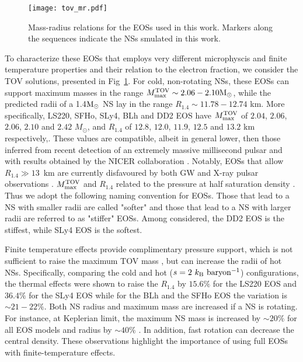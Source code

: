 \begin{figure}[t]
    \centering 
    \texttt{[image: tov\_mr.pdf]}
    \caption{Mass-radius relations for the EOSs used in this work. 
        Markers along the sequences indicate the NSs smulated in this work.}  
    \label{fig:method:tov_mr}
\end{figure}
To characterize these \acp{EOS} that employs very different microphyscis and finite 
temperature properties and their relation to the electron fraction, we consider the \ac{TOV} solutions, 
presented in Fig~\ref{fig:method:tov_mr}.
%
For cold, non-rotating \acp{NS}, these \acp{EOS} can support maximum 
masses in the range $M_\text{max}^\text{TOV}\sim 2.06-2.10{\text{M}_{\odot}}$, while the predicted radii of a 1.4${\text{M}_{\odot}}$ 
NS lay in the range $R_{1.4}\sim 11.78-12.74$ km. 
More specifically, LS220, SFHo, SLy4, BLh and DD2 \ac{EOS} have 
$M_\text{max}^\text{TOV}$ of $2.04$, $2.06$, $2.06$, $2.10$ and $2.42$ $M_\odot$, and 
$R_{1.4}$ of $12.8$, $12.0$, $11.9$, $12.5$ and $13.2$ km respectively,.
%
These values are compatible, albeit in general lower, then those inferred from 
recent detection of an extremely massive millisecond pulsar \citep{Cromartie:2019kug} and with results obtained 
by the NICER collaboration \citep{Miller:2019cac,Riley:2019yda}.
Notably, \acp{EOS} that allow $R_{1.4}\gg 13$~km are currently disfavoured by both 
\ac{GW} \GW{} and X-ray pulsar observations \citep{Abbott:2018wiz,Miller:2019cac,Riley:2019yda}.
%
$M_\text{max}^\text{TOV}$ and $R_{1.4}$ related to the pressure at half saturation density \citep{Lattimer:2012nd}.
Thus we adopt the following naming convention for \acp{EOS}. Those that lead to a \ac{NS} with smaller 
radii are called "softer" and those that lead to a NS with larger radii are referred to as "stiffer" \acp{EOS}. 
Among considered, the DD2 \ac{EOS} is the stiffest, while SLy4 \ac{EOS} is the softest.

Finite temperature effects provide complimentary pressure support,
which is not sufficient to raise the maximum \ac{TOV} mass 
\citep{Kaplan:2013wra}, but can increase the radii of hot \acp{NS}.
Specifically, comparing the cold and hot ($s=2~{k_{\rm B}~{\rm baryon^{-1}}}$)
configurations, the thermal effects were shown to raise the $R_{1.4}$
by $15.6 \%$ for the LS220 EOS and $36.4 \%$ for the SLy4 EOS 
while for the BLh and the SFHo EOS the variation is $\sim 21-22 \%$.
%
Both \ac{NS} radius and maximum mass are increased if a \ac{NS} is rotating. 
For instance, at Keplerian limit, the maximum \ac{NS} mass is increased by 
$\sim 20\%$ for all \ac{EOS} models and radius by $\sim 40\%$ \citep{Bernuzzi:2020txg}. 
In addition, fast rotation can decrease the central density.
%
These observations highlight the importance of using full \acp{EOS} with finite-temperature effects. 

